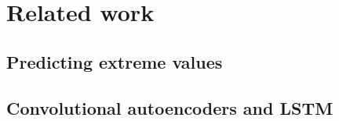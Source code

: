 
\chapter{Related work}\label{RelatedWorkMain}

\section{Predicting extreme values}

\section{Convolutional autoencoders and LSTM}
